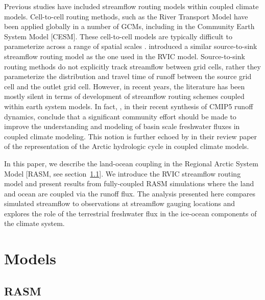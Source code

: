 \documentclass[jgrga, draft]{agutex}
\begin{document}
\begin{article}
Previous studies have included streamflow routing models within coupled climate models.
Cell-to-cell routing methods, such as the River Transport Model \citep[RTM][]{Branstetter_2003} have been applied globally in a number of GCMs, including in the Community Earth System Model [CESM].
These cell-to-cell models are typically difficult to parameterize across a range of spatial scales \citep{Sushama_2004}.
\citep{Olivera_2000} introduced a similar source-to-sink streamflow routing model as the one used in the RVIC model.
Source-to-sink routing methods do not explicitly track streamflow between grid cells, rather they parameterize the distribution and travel time of runoff between the source grid cell and the outlet grid cell.
However, in recent years, the literature has been mostly silent in terms of development of streamflow routing schemes coupled within earth system models.
In fact, \citet{Bring_2015}, in their recent synthesis of CMIP5 runoff dynamics, conclude that a significant community effort should be made to improve the understanding and modeling of basin scale freshwater fluxes in coupled climate modeling.
This notion is further echoed by \citet{Lique_2015} in their review paper of the representation of the Arctic hydrologic cycle in coupled climate models.

In this paper, we describe the land-ocean coupling in the Regional Arctic System Model [RASM, see section~\ref{sec:rasm}].
We introduce the RVIC streamflow routing model and present results from fully-coupled RASM simulations where the land and ocean are coupled via the runoff flux.
The analysis presented here compares simulated streamflow to observations at streamflow gauging locations and explores the role of the terrestrial freshwater flux in the ice-ocean components of the climate system.

\section{Models}

\subsection{RASM}
\label{sec:rasm}


\end{article}
\end{document}
